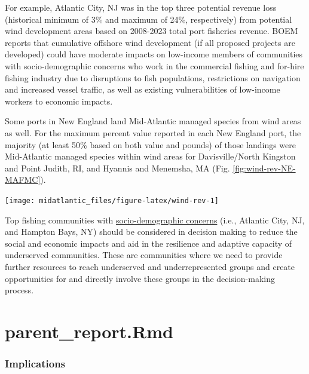 \documentclass[
  10pt,
]{article}
\let\origfigure\figure
\let\endorigfigure\endfigure
\renewenvironment{figure}[1][2] {
    \expandafter\origfigure\expandafter[H]
} {
    \endorigfigure
}
\begin{document}
For example, Atlantic City, NJ was in the top three potential revenue loss (historical minimum of 3\% and maximum of 24\%, respectively) from potential wind development areas based on 2008-2023 total port fisheries revenue. BOEM reports that cumulative offshore wind development (if all proposed projects are developed) could have moderate impacts on low-income members of communities with socio-demographic concerns who work in the commercial fishing and for-hire fishing industry due to disruptions to fish populations, restrictions on navigation and increased vessel traffic, as well as existing vulnerabilities of low-income workers to economic impacts.

Some ports in New England land Mid-Atlantic managed species from wind areas as well. For the maximum percent value reported in each New England port, the majority (at least 50\% based on both value and pounds) of those landings were Mid-Atlantic managed species within wind areas for Davisville/North Kingston and Point Judith, RI, and Hyannis and Menemsha, MA (Fig. \ref{fig:wind-rev-NE-MAFMC}).

\begin{figure}

\texttt{[image: midatlantic\_files/figure-latex/wind-rev-1]} \hfill{}

\caption{Percent of Mid-Atlantic port revenue with majority NEFMC landings from Wind Energy Areas (WEA) in descending order from most to least port fisheries revenue from WEA.}\label{fig:wind-rev}
\end{figure}

Top fishing communities with \href{https://noaa-edab.github.io/catalog/engagement.html}{socio-demographic concerns} (i.e., Atlantic City, NJ, and Hampton Bays, NY) should be considered in decision making to reduce the social and economic impacts and aid in the resilience and adaptive capacity of underserved communities. These are communities where we need to provide further resources to reach underserved and underrepresented groups and create opportunities for and directly involve these groups in the decision-making process.

\section{parent\_report.Rmd}\label{parent_report.rmd-7}

\subsubsection{Implications}\label{implications-6}
\end{document}
